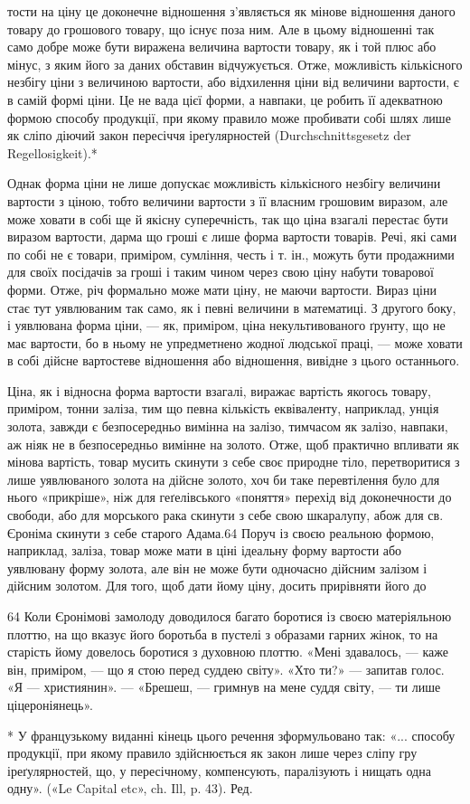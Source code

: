тости на ціну це доконечне відношення з’являється як мінове
відношення даного товару до грошового товару, що існує поза
ним. Але в цьому відношенні так само добре може бути виражена
величина вартости товару, як і той плюс або мінус, з яким його
за даних обставин відчужується. Отже, можливість кількісного
незбігу ціни з величиною вартости, або відхилення ціни від величини
вартости, є в самій формі ціни. Це не вада цієї форми, а
навпаки, це робить її адекватною формою способу продукції,
при якому правило може пробивати собі шлях лише як сліпо
діючий закон пересіччя іреґулярностей (Durchschnittsgesetz der
Regellosigkeit).*

Однак форма ціни не лише допускає можливість кількісного
незбігу величини вартости з ціною, тобто величини вартости
з її власним грошовим виразом, але може ховати в собі ще й
якісну суперечність, так що ціна взагалі перестає бути виразом
вартости, дарма що гроші є лише форма вартости товарів. Речі,
які сами по собі не є товари, приміром, сумління, честь і т. ін.,
можуть бути продажними для своїх посідачів за гроші і таким
чином через свою ціну набути товарової форми. Отже, річ формально
може мати ціну, не маючи вартости. Вираз ціни стає тут
уявлюваним так само, як і певні величини в математиці. З другого
боку, і уявлювана форма ціни, — як, приміром, ціна некультивованого
ґрунту, що не має вартости, бо в ньому не упредметнено
жодної людської праці, — може ховати в собі дійсне вартостеве
відношення або відношення, вивідне з цього останнього.

Ціна, як і відносна форма вартости взагалі, виражає вартість
якогось товару, приміром, тонни заліза, тим що певна кількість
еквіваленту, наприклад, унція золота, завжди є безпосередньо
вимінна на залізо, тимчасом як залізо, навпаки, аж ніяк не в
безпосередньо вимінне на золото. Отже, щоб практично впливати
як мінова вартість, товар мусить скинути з себе своє природне
тіло, перетворитися з лише уявлюваного золота на дійсне
золото, хоч би таке перевтілення було для нього «прикріше»,
ніж для геґелівського «поняття» перехід від доконечности до
свободи, або для морського рака скинути з себе свою шкаралупу,
абож для св. Єроніма скинути з себе старого Адама.64 Поруч
із своєю реальною формою, наприклад, заліза, товар може мати
в ціні ідеальну форму вартости або уявлювану форму золота,
але він не може бути одночасно дійсним залізом і дійсним золотом.
Для того, щоб дати йому ціну, досить прирівняти його до

64 Коли Єронімові замолоду доводилося багато боротися із своєю
матеріяльною плоттю, на що вказує його боротьба в пустелі з образами
гарних жінок, то на старість йому довелось боротися з духовною плоттю.
«Мені здавалось, — каже він, приміром, — що я стою перед суддею світу».
«Хто ти?» — запитав голос. «Я — християнин». — «Брешеш, — гримнув
на мене суддя світу, — ти лише ціцероніянець».

* У французькому виданні кінець цього речення зформульовано
так: «... способу продукції, при якому правило здійснюється як закон
лише через сліпу гру іреґулярностей, що, у пересічному, компенсують,
паралізують і нищать одна одну». («Le Capital etc», ch. Ill, p. 43). Ред.
